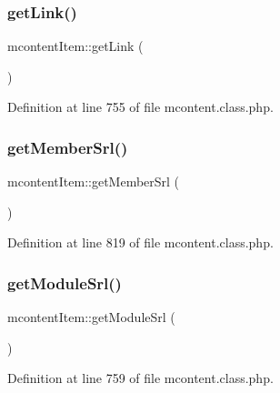 \subsubsection{\texorpdfstring{get\+Link()}{getLink()}}
{\footnotesize\ttfamily mcontent\+Item\+::get\+Link (\begin{DoxyParamCaption}{ }\end{DoxyParamCaption})}



Definition at line 755 of file mcontent.\+class.\+php.

\mbox{\label{classmcontentItem_ab7ad6741a93ab7d631f78bf1253f6800}} 
\subsubsection{\texorpdfstring{get\+Member\+Srl()}{getMemberSrl()}}
{\footnotesize\ttfamily mcontent\+Item\+::get\+Member\+Srl (\begin{DoxyParamCaption}{ }\end{DoxyParamCaption})}



Definition at line 819 of file mcontent.\+class.\+php.

\mbox{\label{classmcontentItem_a9b9841e39ff3ee331679270f9e075203}} 
\subsubsection{\texorpdfstring{get\+Module\+Srl()}{getModuleSrl()}}
{\footnotesize\ttfamily mcontent\+Item\+::get\+Module\+Srl (\begin{DoxyParamCaption}{ }\end{DoxyParamCaption})}



Definition at line 759 of file mcontent.\+class.\+php.

\mbox{\label{classmcontentItem_a8182db3f99934760d5f52082b233a1cb}} 
